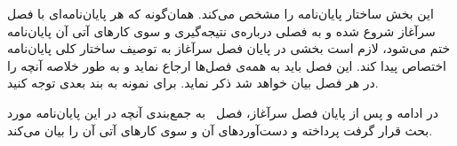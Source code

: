 
این بخش ساختار پایان‌نامه را مشخص می‌کند. همان‌گونه که هر پایان‌نامه‌ای با فصل سرآغاز شروع شده و به فصلی درباره‌ی نتیجه‌گیری و سوی کارهای آتی آن پایان‌نامه ختم می‌شود، لازم است بخشی در پایان فصل سرآغاز به توصیف ساختار کلی پایان‌نامه اختصاص پیدا کند.
این فصل باید به همه‌ی فصل‌ها ارجاع نماید و به طور خلاصه آنچه را در هر فصل بیان خواهد شد ذکر نماید. برای نمونه به بند بعدی توجه کنید.

در ادامه و پس از پایان فصل سرآغاز، فصل~ به جمع‌بندی آنچه در  این  پایان‌نامه مورد بحث قرار گرفت پرداخته و دست‌آوردهای آن و سوی کارهای آتی آن را بیان  می‌کند.
